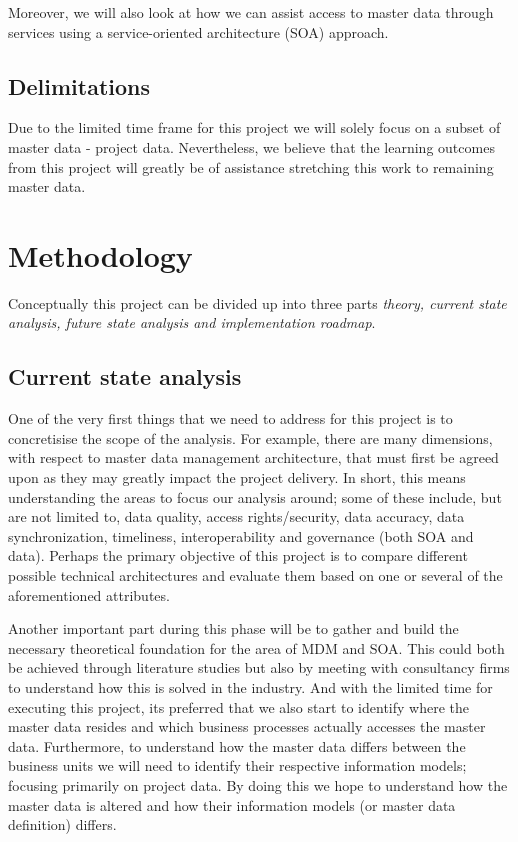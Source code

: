 \documentclass[12pt]{article}
\begin{document}
Moreover, we will also look at how we can assist access to master data through services using a service-oriented architecture (SOA) approach.

\subsection{Delimitations}
\label{ch:delimitations}
Due to the limited time frame for this project we will solely focus on a subset of master data - project data. Nevertheless, we believe that the learning outcomes from this project will greatly be of assistance stretching this work to remaining master data.


\section{Methodology}
\label{ch:proposal}

Conceptually this project can be divided up into three parts \emph{theory, current state analysis, future state analysis and implementation roadmap}. 

\subsection{Current state analysis}
\label{ch:plan}
One of the very first things that we need to address for this project is to concretisise the scope of the analysis. For example, there are many dimensions, with respect to master data management architecture, that must first be agreed upon as they may greatly impact the project delivery. In short, this means understanding the areas to focus our analysis around; some of these include, but are not limited to, data quality, access rights/security, data accuracy, data synchronization, timeliness, interoperability and governance (both SOA and data). Perhaps the primary objective of this project is to compare different possible technical architectures and evaluate them based on one or several of the aforementioned attributes. 

Another important part during this phase will be to gather and build the necessary theoretical foundation for the area of MDM and SOA. This could both be achieved through literature studies but also by meeting with consultancy firms to understand how this is solved in the industry. And with the limited time for executing this project, its preferred that we also start to identify where the master data resides and which business processes actually accesses the master data. Furthermore, to understand how the master data differs between the business units we will need to identify their respective information models; focusing primarily on project data. By doing this we hope to understand how the master data is altered and how their information models (or master data definition) differs.
\end{document}
